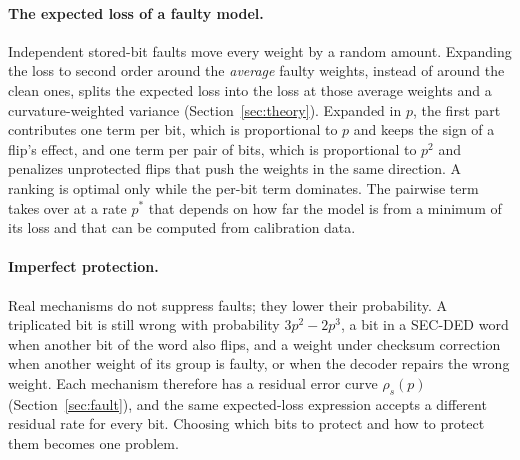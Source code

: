 \paragraph{The expected loss of a faulty model.} Independent stored-bit faults move every weight by a random amount. Expanding the loss to second order around the \emph{average} faulty weights, instead of around the clean ones, splits the expected loss into the loss at those average weights and a curvature-weighted variance (Section~\ref{sec:theory}). Expanded in $p$, the first part contributes one term per bit, which is proportional to $p$ and keeps the sign of a flip's effect, and one term per pair of bits, which is proportional to $p^2$ and penalizes unprotected flips that push the weights in the same direction. A ranking is optimal only while the per-bit term dominates. The pairwise term takes over at a rate $p^*$ that depends on how far the model is from a minimum of its loss and that can be computed from calibration data.

\paragraph{Imperfect protection.} Real mechanisms do not suppress faults; they lower their probability. A triplicated bit is still wrong with probability $3p^2-2p^3$, a bit in a SEC-DED word when another bit of the word also flips, and a weight under checksum correction when another weight of its group is faulty, or when the decoder repairs the wrong weight. Each mechanism therefore has a residual error curve $\rho_s(p)$ (Section~\ref{sec:fault}), and the same expected-loss expression accepts a different residual rate for every bit. Choosing which bits to protect and how to protect them becomes one problem.

